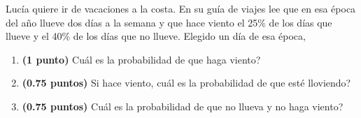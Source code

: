 
Lucía quiere ir de vacaciones a la costa. En su guía de viajes lee que en esa época del año llueve dos días a la semana y que hace viento el 25\% de los días que llueve y el 40\% de los días que no llueve. Elegido un día de esa época,
\begin{enumerate}[label=\alph*)]
\item \textbf{(1 punto)} \textquestiondown{}Cuál es la probabilidad de que haga viento?
\item \textbf{(0.75 puntos)} Si hace viento, \textquestiondown{}cuál es la probabilidad de que esté lloviendo?
\item \textbf{(0.75 puntos)} \textquestiondown{}Cuál es la probabilidad de que no llueva y no haga viento?
\end{enumerate}
